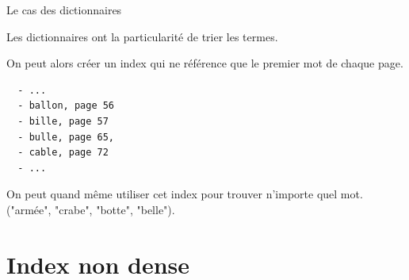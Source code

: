 \begin{frame}[fragile]{Le cas des dictionnaires}

Les dictionnaires ont la particularité de \alert{trier} les termes.

\vfill

On peut alors créer un index qui ne référence que \alert{le premier mot de chaque page}.

\begin{verbatim}
  - ...
  - ballon, page 56
  - bille, page 57
  - bulle, page 65,
  - cable, page 72
  - ...
\end{verbatim}

\begin{blocgauche}
\alert{On peut quand même utiliser cet index pour trouver n'importe quel mot}.
("armée", "crabe", "botte", "belle").
\end{blocgauche}
\end{frame}
\section{Index non dense}

